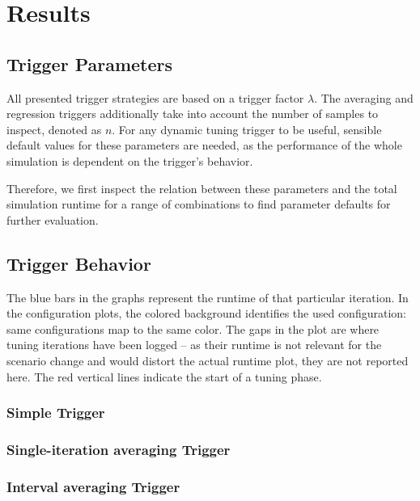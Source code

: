 \chapter[Results]{Results}
\label{cp:results}

{
	\parindent0pt
\textellipsis
}


\section{Trigger Parameters}
All presented trigger strategies are based on a trigger factor $\lambda$. The averaging and regression triggers additionally take into account the number of samples to inspect, denoted as $n$. For any dynamic tuning trigger to be useful, sensible default values for these parameters are needed, as the performance of the whole simulation is dependent on the trigger's behavior.

Therefore, we first inspect the relation between these parameters and the total simulation runtime for a range of combinations to find parameter defaults for further evaluation.

\section{Trigger Behavior}
The blue bars in the graphs represent the runtime of that particular iteration.
In the configuration plots, the colored background identifies the used configuration: same configurations map to the same color. The gaps in the plot are where tuning iterations have been logged -- as their runtime is not relevant for the scenario change and would distort the actual runtime plot, they are not reported here. The red vertical lines indicate the start of a tuning phase.

\subsection{Simple Trigger}
\subsection{Single-iteration averaging Trigger}
\subsection{Interval averaging Trigger}
